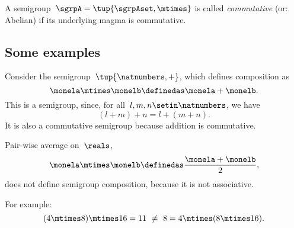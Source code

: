 \begin{definition}
    A semigroup~$\sgrpA = \tup{\sgrpAset, \mtimes}$ is called \emph{commutative} (or: Abelian) if its underlying magma is commutative.
\end{definition}

\subsection{Some examples}

\begin{example}
    \label{exa:natnum-semigroup}
    Consider the semigroup~$\tup{\natnumbers,+}$, which defines composition as
    \begin{equation}
        \label{eq:natnum-semigroup-definition}
        \monela \mtimes \monelb \definedas  \monela + \monelb.
    \end{equation}
    This is a semigroup, since, for all~$l,m, n \setin \natnumbers$, we have
    \begin{equation}
        (l+m)
        +n = l+(m+n).
    \end{equation}
    It is also a commutative semigroup because addition is commutative.
\end{example}

\begin{example}
    Pair-wise average on~$\reals$,
    \begin{equation}
        \label{eq:pairwise}
        \monela \mtimes \monelb \definedas  \frac{\monela + \monelb}{2},
    \end{equation}
    does not define semigroup composition, because it is not associative.

    For example:
    \begin{equation}
        \label{eq:pairwise-counterexample}
        (4 \mtimes 8) \mtimes 16 = 11\  \neq\   8 = 4 \mtimes (8 \mtimes 16).
    \end{equation}
\end{example}


